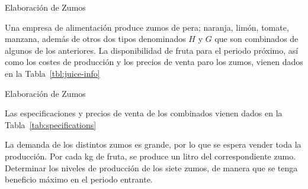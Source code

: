 \documentclass[../../main.tex]{subfiles}
\begin{document}
\begin{frame}{Elaboración de Zumos}{}

    Una empresa de alimentación produce zumos de pera; naranja, limón, tomate, manzana, además de otros dos tipos denominados $H$ y $G$ que son combinados de algunos de los anteriores. La disponibilidad de fruta para el periodo próximo, así como los costes de producción y los precios de venta paro los zumos, vienen dados en la Tabla~\ref{tbl:juice-info}
            \begin{table}[!ht]
        \caption{\label{tbl:juice-info}Información para elaboración de zumos.}
    \centering
    \end{table}
    
    
  \end{frame}
  
\begin{frame}{Elaboración de Zumos}{}

    Las especificaciones y precios de venta de los combinados vienen dados en la Tabla~\ref{tab:specifications}
          \begin{table}
    \caption{\label{tab:specifications}Especificación de zumos combinados.}
    \centering
  \end{table}

      La demanda de los distintos zumos es grande, por lo que se espera vender toda la producción. Por cada kg de fruta, se produce un litro del correspondiente zumo. Determinar los niveles de producción de los siete zumos, de manera que se tenga beneficio máximo en el periodo entrante.%
\end{frame}
\end{document}
